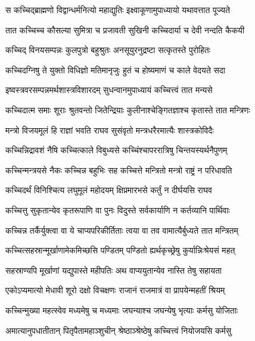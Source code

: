 \twolineshloka
{स कच्चिद्ब्राह्मणो विद्वान्धर्मनित्यो महाद्युतिः}
{इक्ष्वाकूणामुपाध्यायो यथावत्तात पूज्यते} %

\twolineshloka
{तात कच्चिच्च कौसल्या सुमित्रा च प्रजावती}
{सुखिनी कच्चिदार्या च देवी नन्दति कैकयी} %

\twolineshloka
{कच्चिद् विनयसम्पन्नः कुलपुत्रो बहुश्रुतः}
{अनसूयुरनुद्रष्टा सत्कृतस्ते पुरोहितः} %

\twolineshloka
{कच्चिदग्निषु ते युक्तो विधिज्ञो मतिमानृजुः}
{हुतं च होष्यमाणं च काले वेदयते सदा} %

\twolineshloka
{इष्वस्त्रवरसम्पन्नमर्थशास्त्रविशारदम्}
{सुधन्वानमुपाध्यायं कच्चित्त्वं तात मन्यसे} %

\twolineshloka
{कच्चिदात्म समाः शूराः श्रुतवन्तो जितेन्द्रियाः}
{कुलीनाश्चेङ्गितज्ञाश्च कृतास्ते तात मन्त्रिणः} %

\twolineshloka
{मन्त्रो विजयमूलं हि राज्ञां भवति राघव}
{सुसंवृतो मन्त्रधरैरमात्यैः शास्त्रकोविदैः} %

\twolineshloka
{कच्चिन्निद्रावशं नैषि कच्चित्काले विबुध्यसे}
{कच्चिंश्चापररात्रिषु चिन्तयस्यर्थनैपुणम्} %

\twolineshloka
{कच्चिन्मन्त्रयसे नैकः कच्चिन्न बहुभिः सह}
{कच्चित्ते मन्त्रितो मन्त्रो राष्ट्रं न परिधावति} %

\twolineshloka
{कच्चिदर्थं विनिश्चित्य लघुमूलं महोदयम्}
{क्षिप्रमारभसे कर्तुं न दीर्घयसि राघव} %

\twolineshloka
{कच्चित्तु सुकृतान्येव कृतरूपाणि वा पुनः}
{विदुस्ते सर्वकार्याणि न कर्तव्यानि पार्थिवाः} %

\twolineshloka
{कच्चिन्न तर्कैर्युक्त्वा वा ये चाप्यपरिकीर्तिताः}
{त्वया वा तव वामात्यैर्बुध्यते तात मन्त्रितम्} %

\twolineshloka
{कच्चित्सहस्रान्मूर्खाणामेकमिच्छसि पण्डितम्}
{पण्डितो ह्यर्थकृच्छ्रेषु कुर्यान्निःश्रेयसं महत्} %

\twolineshloka
{सहस्राण्यपि मूर्खाणां यद्युपास्ते महीपतिः}
{अथ वाप्ययुतान्येव नास्ति तेषु सहायता} %

\twolineshloka
{एकोऽप्यमात्यो मेधावी शूरो दक्षो विचक्षणः}
{राजानं राजमात्रं वा प्रापयेन्महतीं श्रियम्} %

\twolineshloka
{कच्चिन्मुख्या महत्स्वेव मध्यमेषु च मध्यमाः}
{जघन्याश्च जघन्येषु भृत्याः कर्मसु योजिताः} %

\twolineshloka
{अमात्यानुपधातीतान् पितृपैतामहाञ्शुचीन्}
{श्रेष्ठाञ्श्रेष्ठेषु कच्चित्त्वं नियोजयसि कर्मसु} %

